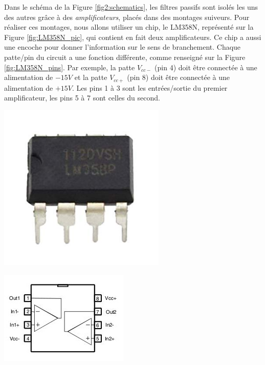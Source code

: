 
Dans le schéma de la Figure \ref{fig2:schematics}, les filtres passifs sont isolés les uns des autres grâce à des \emph{amplificateurs}, placés dans des montages suiveurs. Pour réaliser ces montages, nous allons utiliser un chip, le LM358N, représenté sur la Figure \ref{fig:LM358N_pic}, qui contient en fait deux amplificateurs. Ce chip a aussi une encoche pour donner l'information sur le sens de branchement. Chaque patte/pin du circuit a une fonction différente, comme renseigné sur la Figure \ref{fig:LM358N_pins}. Par exemple, la patte $V_{cc-}$ (pin 4) doit être connectée à une alimentation de $-15 V$ et la patte $V_{cc+}$ (pin 8) doit être connectée à une alimentation de $+15 V$. Les pins 1 à 3 sont les entrées/sortie du premier amplificateur, les pins 5 à 7 sont celles du second.

\begin{minipage}[c]{.49\textwidth}
	\centering
	\includegraphics[width=0.6\textwidth]{figures/LM358N_picture.jpg}
	\label{fig:LM358N_pic}
\end{minipage}
\hfill
\begin{minipage}[c]{.49\textwidth}
	\centering
	\includegraphics[width=\textwidth]{figures/LM358N_connections.jpg}
	\label{fig:LM358N_pins}
\end{minipage}
\vspace{1cm}

